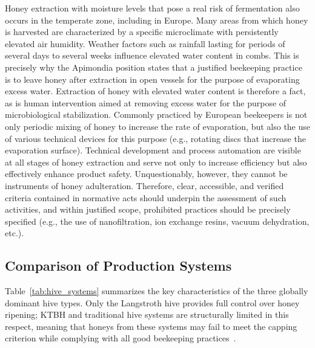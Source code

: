 Honey extraction with moisture levels that pose a real risk of
fermentation also occurs in the temperate zone, including in
Europe. Many areas from which honey is harvested are characterized
by a specific microclimate with persistently elevated air humidity.
Weather factors such as rainfall lasting for periods of several
days to several weeks influence elevated water content in combs.
This is precisely why the Apimondia position states that a justified
beekeeping practice is to leave honey after extraction in open
vessels for the purpose of evaporating excess water. Extraction of
honey with elevated water content is therefore a fact, as is human
intervention aimed at removing excess water for the purpose of
microbiological stabilization. Commonly practiced by European
beekeepers is not only periodic mixing of honey to increase the rate
of evaporation, but also the use of various technical devices for
this purpose (e.g., rotating discs that increase the evaporation
surface). Technical development and process automation are visible
at all stages of honey extraction and serve not only to increase
efficiency but also effectively enhance product safety.
Unquestionably, however, they cannot be instruments of honey
adulteration. Therefore, clear, accessible, and verified criteria
contained in normative acts should underpin the assessment of such
activities, and within justified scope, prohibited practices should
be precisely specified (e.g., the use of nanofiltration, ion exchange
resins, vacuum dehydration, etc.).
\subsection{Comparison of Production Systems}

Table~\ref{tab:hive_systems} summarizes the key characteristics of
the three globally dominant hive types. Only the Langstroth hive
provides full control over honey ripening; KTBH and traditional
hive systems are structurally limited in this respect, meaning that
honeys from these systems may fail to meet the capping criterion
while complying with all good beekeeping
practices~\cite{tadele2025,sciendo2012,lrrd2013}.

